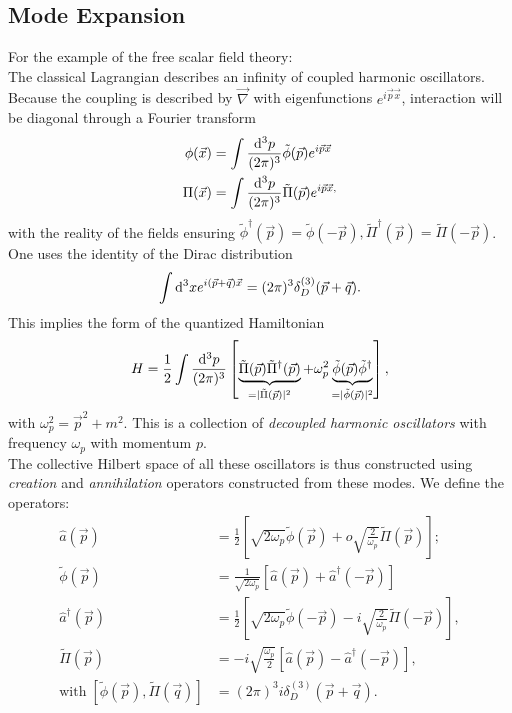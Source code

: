 \subsection{Mode Expansion}
For the example of the free scalar field theory:\\
The classical Lagrangian describes an infinity of coupled harmonic oscillators. Because the coupling is described by $\vec{\nabla}$ with eigenfunctions $e^{i \vec{p} \vec{x}}$, interaction will be diagonal through a Fourier transform
\begin{align}
	\phi(\vec{x}) &= \int \frac{\mathrm{d}^3 p}{(2\pi)^3} \tilde{\phi}(\vec{p}) e^{i \vec{p} \vec{x}} \\
	\Pi (\vec{x}) &= \int \frac{\mathrm{d}^3 p}{(2 \pi)^3} \tilde{\Pi}(\vec{p}) e^{i \vec{p}\vec{x},}
\end{align}
with the reality of the fields ensuring $\tilde{\phi}^{\dagger}(\vec{p})=\tilde{\phi}(-\vec{p}), \tilde{\Pi}^{\dagger}(\vec{p})=\tilde{\Pi}(-\vec{p})$.
One uses the identity of the Dirac distribution 
\begin{equation}
	\int \mathrm{d}^3 x e^{i(\vec{p}+\vec{q}) \vec{x}} = (2 \pi)^3 \delta^{(3)}_D(\vec{p}+\vec{q}).
\end{equation}
This implies the form of the quantized Hamiltonian
\begin{equation}
H = \frac{1}{2} \int \frac{\mathrm{d}^3 p}{(2\pi)^3} \left[\underbrace{\tilde{\Pi}(\vec{p}) \tilde{\Pi}^{\dagger}(\vec{p})}_{=|\tilde{\Pi}(\vec{p}) |^2} + \omega^2_p \underbrace{\tilde{\phi}(\vec{p}) \tilde{\phi}^{\dagger}}_{=|\tilde{\phi}(\vec{p})|^2}\right],
\end{equation}
with $\omega^2_p = \vec{p}^2+m^2$. This is a collection of \emph{decoupled harmonic oscillators} with frequency $\omega_p$ with momentum $p$.\\
The collective Hilbert space of all these oscillators is thus constructed using \emph{creation} and \emph{annihilation} operators constructed from these modes. We define the operators:
\begin{align}
	\hat{a}(\vec{p})&= \frac{1}{2} \left[\sqrt{2 \omega_p} \tilde{\phi}(\vec{p}) + o \sqrt{\frac{2}{\omega_p}} \tilde{\Pi} (\vec{p})\right]; \\
	 \tilde{\phi}(\vec{p}) &= \frac{1}{\sqrt{2 \omega_p}} \left[\hat{a}(\vec{p}) + \hat{a}^{\dagger}(-\vec{p})\right] \\
	\hat{a}^{\dagger}(\vec{p}) &= \frac{1}{2} \left[\sqrt{2 \omega_p} \tilde{\phi}(-\vec{p}) -i \sqrt{\frac{2}{\omega_p}} \tilde{\Pi}(-\vec{p})\right],\\
	 \tilde{\Pi}(\vec{p}) &=-i \sqrt{\frac{\omega_p}{2}} \left[\hat{a}(\vec{p}) - \hat{a}^{\dagger} (-\vec{p})\right],\\
	\mathrm{with} \; \left[\tilde{\phi}(\vec{p}), \tilde{\Pi}(\vec{q}) \right] &= (2 \pi)^3 i \delta^{(3)}_D(\vec{p}+\vec{q}).
\end{align}
